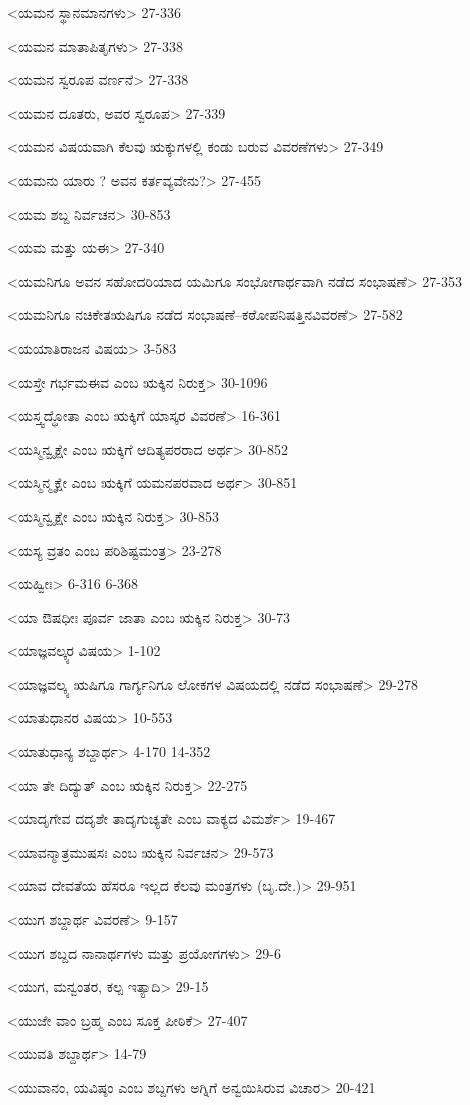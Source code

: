 <ಯಮನ ಸ್ಥಾನಮಾನಗಳು>
27-336

<ಯಮನ ಮಾತಾಪಿತೃಗಳು>
27-338

<ಯಮನ ಸ್ವರೂಪ ವರ್ಣನೆ>
27-338

<ಯಮನ ದೂತರು, ಅವರ ಸ್ವರೂಪ>
27-339

<ಯಮನ ವಿಷಯವಾಗಿ ಕೆಲವು ಋಕ್ಕುಗಳಲ್ಲಿ ಕಂಡು ಬರುವ ವಿವರಣೆಗಳು>
27-349

<ಯಮನು ಯಾರು ? ಅವನ ಕರ್ತವ್ಯವೇನು?>
27-455

<ಯಮ ಶಬ್ದ ನಿರ್ವಚನ>
30-853

<ಯಮ ಮತ್ತು ಯಈ>
27-340

<ಯಮನಿಗೂ ಅವನ ಸಹೋದರಿಯಾದ ಯಮಿಗೂ ಸಂಭೋಗಾರ್ಥವಾಗಿ ನಡೆದ ಸಂಭಾಷಣೆ>
27-353

<ಯಮನಿಗೂ ನಚಿಕೇತಋಷಿಗೂ ನಡೆದ ಸಂಭಾಷಣೆ–ಕಠೋಪನಿಷತ್ತಿನವಿವರಣೆ>
27-582

<ಯಯಾತಿರಾಜನ ವಿಷಯ>
3-583

<ಯಸ್ತೇ ಗರ್ಭಮಈವ ಎಂಬ ಋಕ್ಕಿನ ನಿರುಕ್ತ>
30-1096

<ಯಸ್ತ್ವದ್ಧೋತಾ ಎಂಬ ಋಕ್ಕಿಗೆ ಯಾಸ್ಕರ ವಿವರಣೆ>
16-361

<ಯಸ್ಮಿನ್ವೃಕ್ಷೇ ಎಂಬ ಋಕ್ಕಿಗೆ ಆದಿತ್ಯಪರರಾದ ಅರ್ಥ>
30-852

<ಯಸ್ಮಿನ್ಮೃಕ್ಷೇ ಎಂಬ ಋಕ್ಕಿಗೆ ಯಮನಪರವಾದ ಅರ್ಥ>
30-851

<ಯಸ್ಮಿನ್ವೃಕ್ಷೇ ಎಂಬ ಋಕ್ಕಿನ ನಿರುಕ್ತ>
30-853

<ಯಸ್ಯ ವ್ರತಂ ಎಂಬ ಪರಿಶಿಷ್ಟಮಂತ್ರ>
23-278

<ಯಹ್ವೀಃ>
6-316
6-368

<ಯಾ ಔಷಧೀಃ ಪೂರ್ವ ಜಾತಾ ಎಂಬ ಋಕ್ಕಿನ ನಿರುಕ್ತ>
30-73

<ಯಾಜ್ಞವಲ್ಕ್ಯರ ವಿಷಯ>
1-102

<ಯಾಜ್ಞವಲ್ಕ್ಯ ಋಷಿಗೂ ಗಾರ್ಗ್ಯನಿಗೂ ಲೋಕಗಳ ವಿಷಯದಲ್ಲಿ ನಡೆದ ಸಂಭಾಷಣೆ>
29-278

<ಯಾತುಧಾನರ ವಿಷಯ>
10-553

<ಯಾತುಧಾನ್ಯ ಶಬ್ದಾರ್ಥ>
4-170 
14-352

<ಯಾ ತೇ ದಿದ್ಯುತ್‍ ಎಂಬ ಋಕ್ಕಿನ ನಿರುಕ್ತ>
22-275

<ಯಾದೃಗೇವ ದದೃಶೇ ತಾದೃಗುಚ್ಯತೇ ಎಂಬ ವಾಕ್ಯದ ವಿಮರ್ಶೆ>
19-467

<ಯಾವನ್ಮಾತ್ರಮುಷಸಃ ಎಂಬ ಋಕ್ಕಿನ ನಿರ್ವಚನ>
29-573

<ಯಾವ ದೇವತೆಯ ಹೆಸರೂ ಇಲ್ಲದ ಕೆಲವು ಮಂತ್ರಗಳು (ಬೃ.ದೇ.)>
29-951

<ಯುಗ ಶಬ್ದಾರ್ಥ ವಿವರಣೆ>
9-157

<ಯುಗ ಶಬ್ದದ ನಾನಾರ್ಥಗಳು ಮತ್ತು ಪ್ರಯೋಗಗಳು>
29-6

<ಯುಗ, ಮನ್ವಂತರ, ಕಲ್ಪ ಇತ್ಯಾದಿ>
29-15

<ಯುಜೇ ವಾಂ ಬ್ರಹ್ಮ ಎಂಬ ಸೂಕ್ತ ಪೀಠಿಕೆ>
27-407

<ಯುವತಿ ಶಬ್ದಾರ್ಥ>
14-79

<ಯುವಾನಂ, ಯವಿಷ್ಠಂ ಎಂಬ ಶಬ್ದಗಳು ಅಗ್ನಿಗೆ ಅನ್ವಯಿಸಿರುವ ವಿಚಾರ>
20-421

